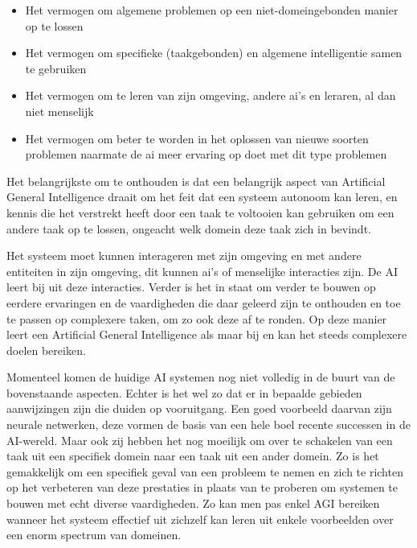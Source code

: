 \begin{itemize}
    \item Het vermogen om algemene problemen op een niet-domeingebonden manier op te lossen
    \item Het vermogen om specifieke (taakgebonden) en algemene intelligentie samen te gebruiken
    \item Het vermogen om te leren van zijn omgeving, andere ai's en leraren, al dan niet menselijk
    \item Het vermogen om beter te worden in het oplossen van nieuwe soorten problemen naarmate de ai meer ervaring op doet met dit type problemen
\end{itemize}

Het belangrijkste om te onthouden is dat een belangrijk aspect van Artificial General Intelligence draait om het feit dat een systeem autonoom kan leren, en kennis die het verstrekt heeft door een taak te voltooien kan gebruiken om een andere taak op te lossen, ongeacht welk domein deze taak zich in bevindt. 

Het systeem moet kunnen interageren met zijn omgeving en met andere entiteiten in zijn omgeving, dit kunnen ai's of menselijke interacties zijn. De AI leert bij uit deze interacties. Verder is het in staat om verder te bouwen op eerdere ervaringen en de vaardigheden die daar geleerd zijn te onthouden en toe te passen op complexere taken, om zo ook deze af te ronden. Op deze manier leert een Artificial General Intelligence als maar bij en kan het steeds complexere doelen bereiken.

\cite{goertzel2007artificial}

Momenteel komen de huidige AI systemen nog niet volledig in de buurt van de bovenstaande aspecten. Echter is het wel zo dat er in bepaalde gebieden aanwijzingen zijn die duiden op vooruitgang. Een goed voorbeeld daarvan zijn neurale netwerken, deze vormen de basis van een hele boel recente successen in de AI-wereld. Maar ook zij hebben het nog moeilijk om over te schakelen van een taak uit een specifiek domein naar een taak uit een ander domein. Zo is het gemakkelijk om een specifiek geval van een probleem te nemen en zich te richten op het verbeteren van deze prestaties in plaats van te proberen om systemen te bouwen met echt diverse vaardigheden. Zo kan men pas enkel AGI bereiken wanneer het systeem effectief uit zichzelf kan leren uit enkele voorbeelden over een enorm spectrum van domeinen.

\cite{shevlin2019limits}

